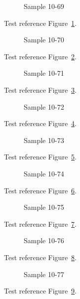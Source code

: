 \begin{figure}[tbhp]
\caption{Sample 10-69}
\label{fig:sample-10-69}
\end{figure}

Test reference Figure~\ref{fig:sample-10-69}.

\begin{figure}[tbhp]
\caption{Sample 10-70}
\label{fig:sample-10-70}
\end{figure}

Test reference Figure~\ref{fig:sample-10-70}.

\begin{figure}[tbhp]
\caption{Sample 10-71}
\label{fig:sample-10-71}
\end{figure}

Test reference Figure~\ref{fig:sample-10-71}.

\begin{figure}[tbhp]
\caption{Sample 10-72}
\label{fig:sample-10-72}
\end{figure}

Test reference Figure~\ref{fig:sample-10-72}.

\begin{figure}[tbhp]
\caption{Sample 10-73}
\label{fig:sample-10-73}
\end{figure}

Test reference Figure~\ref{fig:sample-10-73}.

\begin{figure}[tbhp]
\caption{Sample 10-74}
\label{fig:sample-10-74}
\end{figure}

Test reference Figure~\ref{fig:sample-10-74}.

\begin{figure}[tbhp]
\caption{Sample 10-75}
\label{fig:sample-10-75}
\end{figure}

Test reference Figure~\ref{fig:sample-10-75}.

\begin{figure}[tbhp]
\caption{Sample 10-76}
\label{fig:sample-10-76}
\end{figure}

Test reference Figure~\ref{fig:sample-10-76}.

\begin{figure}[tbhp]
\caption{Sample 10-77}
\label{fig:sample-10-77}
\end{figure}

Test reference Figure~\ref{fig:sample-10-77}.

